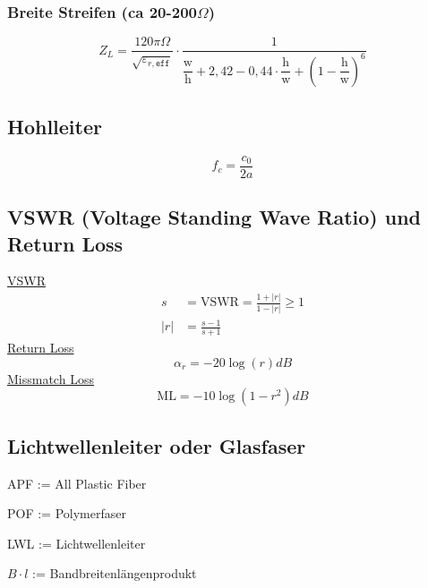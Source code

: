 \subsubsection[Breite Streifen]{Breite Streifen (ca 20-200$\Omega$)}
\[
    Z_L = \frac{120\pi\Omega}{\sqrt{\varepsilon_{r,\texttt{eff}}}}\cdot\frac{1}{\dfrac{\mathrm{w}}{\mathrm{h}}+2,42-0,44\cdot\dfrac{\mathrm{h}}{\mathrm{w}}+\left(1-\dfrac{\mathrm{h}}{\mathrm{w}}\right)^6}
\]

\subsection{Hohlleiter}
\[
    f_c = \frac{c_0}{2a}
\]

\subsection{VSWR (Voltage Standing Wave Ratio) und Return Loss}
\underline{VSWR}
\begin{align*}
    s   & = \mathrm{VSWR} = \frac{1+|r|}{1-|r|}\geq 1 \\
    |r| & = \frac{s-1}{s+1}
\end{align*}
\underline{Return Loss}
\[
    \alpha_r = -20\log(r)dB
\]
\underline{Missmatch Loss}
\[
    \mathrm{ML} = -10\log(1-r^2)dB
\]
\subsection{Lichtwellenleiter oder Glasfaser}

\begin{description}
    \setlength\itemsep{1pt}
    \item APF := All Plastic Fiber
    \item POF := Polymerfaser
    \item LWL := Lichtwellenleiter
    \item $B\cdot l$ := Bandbreitenlängenprodukt
\end{description}

